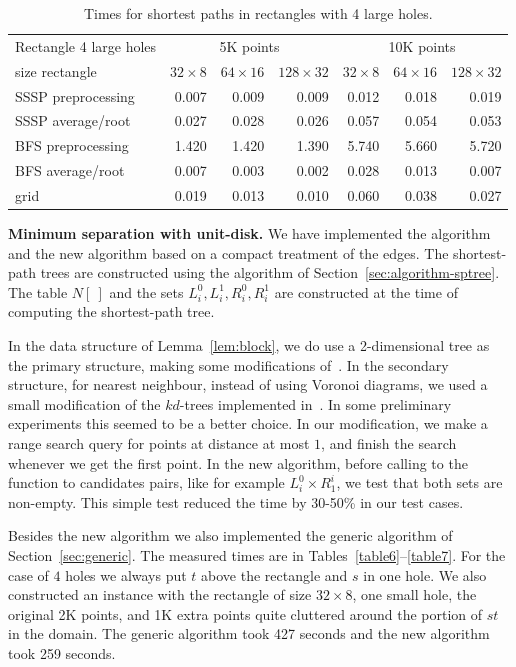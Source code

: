 \documentclass[a4paper,USenglish]{lipics}
\def\myparagraph#1{\medskip\noindent\textbf{#1.}}
\begin{document}
\begin{table}
\begin{tabular}{l*{3}{r}|*{3}{r}}
Rectangle 4 large holes & \multicolumn{3}{c|}{5K points} & \multicolumn{3}{c}{10K points}\\
size rectangle	&	$32\times 8$	&	$64\times 16$	&	$128\times 32$	&	$32\times 8$	&	$64\times 16$	&	$128\times 32$\\						
\hline
SSSP preprocessing	&	0.007	&	0.009	&	0.009	&	0.012	&	0.018	&	0.019	\\
SSSP average/root	&	0.027	&	0.028	&	0.026	&	0.057	&	0.054	&	0.053	\\
BFS preprocessing	&	1.420	&	1.420	&	1.390	&	5.740	&	5.660	&	5.720	\\
BFS average/root	&	0.007	&	0.003	&	0.002	&	0.028	&	0.013	&	0.007	\\
grid				&	0.019	&	0.013	&	0.010	&	0.060	&	0.038	&	0.027
\end{tabular}
\caption{Times for shortest paths in rectangles with 4 large holes.}
\label{table5}
\end{table}



\myparagraph{Minimum separation with unit-disk}
We have implemented the algorithm 
and the new algorithm based on a compact treatment of the edges.
The shortest-path trees are constructed using the algorithm of Section~\ref{sec:algorithm-sptree}.
The table $N[~]$ and the sets $L^0_i,L^1_i,R^0_i,R^1_i$
are constructed at the time of computing the shortest-path tree.

In the data structure of Lemma~\ref{lem:block},
we do use a 2-dimensional tree as the primary structure, making some modifications
of~\cite{cgal:n-rstd-15a}. In the secondary structure, for nearest neighbour, 
instead of using Voronoi diagrams, we used a small modification of
the $kd$-trees implemented in~\cite{cgal:tf-ssd-15a}. 
In some preliminary experiments this seemed to be a better choice.
In our modification, we make a range search query for points at distance at most $1$,
and finish the search whenever we get the first point.
%
In the new algorithm, before calling to the function to candidates pairs, like for example $L_i^0\times R^i_1$,
we test that both sets are non-empty. This simple test reduced the time by 30-50\%
in our test cases.

Besides the new algorithm we also implemented the generic algorithm of Section~\ref{sec:generic}.
The measured times are in Tables~\ref{table6}--\ref{table7}.
For the case of $4$ holes we always put $t$ above the rectangle and $s$ in one hole. %
 We also constructed an instance with the rectangle of size $32\times 8$, one small hole,
the original 2K points, and 1K extra points quite cluttered
around the portion of $st$ in the domain. The generic algorithm took 427 seconds and the new
algorithm took 259 seconds.
\end{document}
